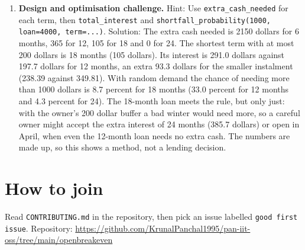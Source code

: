 \documentclass[11pt,a4paper]{article}
\begin{document}
\begin{enumerate}[nosep]
\item \textbf{Design and optimisation challenge.} Hint: Use \texttt{extra\_cash\_needed} for each term, then \texttt{total\_interest} and \texttt{shortfall\_probability(1000, loan=4000, term=...)}. Solution: The extra cash needed is 2150 dollars for 6 months, 365 for 12, 105 for 18 and 0 for 24. The shortest term with at most 200 dollars is 18 months (105 dollars). Its interest is 291.0 dollars against 197.7 dollars for 12 months, an extra 93.3 dollars for the smaller instalment (238.39 against 349.81). With random demand the chance of needing more than 1000 dollars is 8.7 percent for 18 months (33.0 percent for 12 months and 4.3 percent for 24). The 18-month loan meets the rule, but only just: with the owner's 200 dollar buffer a bad winter would need more, so a careful owner might accept the extra interest of 24 months (385.7 dollars) or open in April, when even the 12-month loan needs no extra cash. The numbers are made up, so this shows a method, not a lending decision.
\end{enumerate}

\section{How to join}
Read \texttt{CONTRIBUTING.md} in the repository, then pick an issue labelled \texttt{good first issue}. Repository: \url{https://github.com/KrunalPanchal1995/pan-iit-oss/tree/main/openbreakeven}
\end{document}
